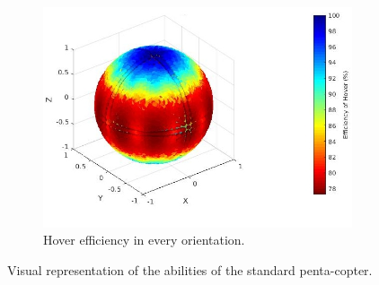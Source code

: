 \begin{figure}[!ht]
\begin{center}
\begin{subfigure}[b]{0.47\textwidth}
    \includegraphics[width=\linewidth]{images/Penta_standard_hspace.jpg}
    \caption{Hover efficiency in every orientation.} \label{fig:penta_standard_hspace}
  \end{subfigure}
  \caption{Visual representation of the abilities of the standard penta-copter.}
  \label{fig:penta_standard_spaces}
  \end{center}
\end{figure}

\begin{table}[!ht]
\begin{center}
 \caption{Information on the designs’ force space properties.}\vspace{1ex}
 \label{tab:tab_Penta_compare_force}
\end{center}
\end{table}

\begin{table}[!ht]
\begin{center}
 \caption{Information on the designs’ torque space properties.}\vspace{1ex}
 \label{tab:tab_Penta_compare_torque}
\end{center}
\end{table}

